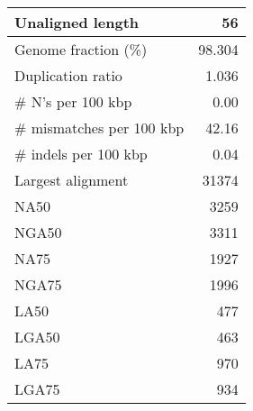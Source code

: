 \documentclass[12pt,a4paper]{article}
\begin{document}
\begin{table}[ht]
\begin{center}
\begin{tabular}{|l*{1}{|r}|}
Unaligned length & 56 \\ \hline
Genome fraction (\%) & 98.304 \\ \hline
Duplication ratio & 1.036 \\ \hline
\# N's per 100 kbp & 0.00 \\ \hline
\# mismatches per 100 kbp & 42.16 \\ \hline
\# indels per 100 kbp & 0.04 \\ \hline
Largest alignment & 31374 \\ \hline
NA50 & 3259 \\ \hline
NGA50 & 3311 \\ \hline
NA75 & 1927 \\ \hline
NGA75 & 1996 \\ \hline
LA50 & 477 \\ \hline
LGA50 & 463 \\ \hline
LA75 & 970 \\ \hline
LGA75 & 934 \\ \hline
\end{tabular}
\end{center}
\end{table}
\end{document}
